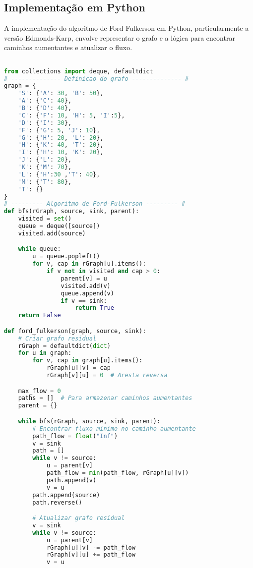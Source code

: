 \documentclass[12pt]{article}
\begin{document}
\newpage
\subsection{Implementação em Python}

A implementação do algoritmo de Ford-Fulkerson em Python, particularmente a versão Edmonds-Karp, envolve representar o grafo e a lógica para encontrar caminhos aumentantes e atualizar o fluxo.\vskip0.5cm


\begin{lstlisting}[language=Python, caption={}, label={lst:fordfulkerson}]

from collections import deque, defaultdict
# -------------- Definicao do grafo -------------- #
graph = {
    'S': {'A': 30, 'B': 50},
    'A': {'C': 40},
    'B': {'D': 40},
    'C': {'F': 10, 'H': 5, 'I':5},
    'D': {'I': 30},
    'F': {'G': 5, 'J': 10},
    'G': {'H': 20, 'L': 20},
    'H': {'K': 40, 'T': 20},
    'I': {'H': 10, 'K': 20},
    'J': {'L': 20},
    'K': {'M': 70},
    'L': {'H':30 ,'T': 40},
    'M': {'T': 80},
    'T': {}
}
# --------- Algoritmo de Ford-Fulkerson --------- #
def bfs(rGraph, source, sink, parent):
    visited = set()
    queue = deque([source])
    visited.add(source)

    while queue:
        u = queue.popleft()
        for v, cap in rGraph[u].items():
            if v not in visited and cap > 0:
                parent[v] = u
                visited.add(v)
                queue.append(v)
                if v == sink:
                    return True
    return False

def ford_fulkerson(graph, source, sink):
    # Criar grafo residual
    rGraph = defaultdict(dict)
    for u in graph:
        for v, cap in graph[u].items():
            rGraph[u][v] = cap
            rGraph[v][u] = 0  # Aresta reversa

    max_flow = 0
    paths = []  # Para armazenar caminhos aumentantes
    parent = {}

    while bfs(rGraph, source, sink, parent):
        # Encontrar fluxo mínimo no caminho aumentante
        path_flow = float("Inf")
        v = sink
        path = []
        while v != source:
            u = parent[v]
            path_flow = min(path_flow, rGraph[u][v])
            path.append(v)
            v = u
        path.append(source)
        path.reverse()

        # Atualizar grafo residual
        v = sink
        while v != source:
            u = parent[v]
            rGraph[u][v] -= path_flow
            rGraph[v][u] += path_flow
            v = u


\end{lstlisting}
\end{document}
